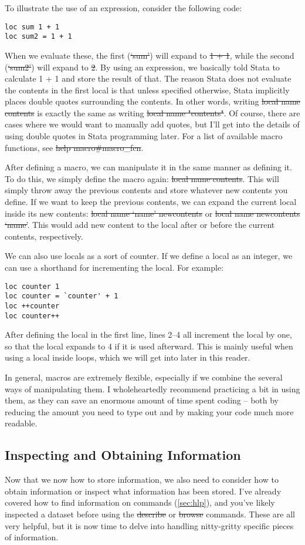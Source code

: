To illustrate the use of an expression, consider the following code:
\begin{verbatim}
loc sum 1 + 1
loc sum2 = 1 + 1
\end{verbatim}
When we evaluate these, the first (\st{`sum'}) will expand to \st{1 + 1},
while the second (\st{`sum2'}) will expand to \st{2}.
By using an expression,
we basically told Stata to calculate 1 + 1 and store the result of that.
The reason Stata does not evaluate the contents in the first local is that unless specified otherwise,
Stata implicitly places double quotes surrounding the contents.
In other words, writing \st{local name contents} is exactly the same as writing \st{local name "contents"}.
Of course, there are cases where we would want to manually add quotes,
but I'll get into the details of using double quotes in Stata programming later.
For a list of available macro functions, see \st{help macro#macro_fcn}.

After defining a macro, we can manipulate it in the same manner as defining it.
To do this, we simply define the macro again: \st{local name contents}.
This will simply throw away the previous contents and store whatever new contents you define.
If we want to keep the previous contents,
we can expand the current local inside its new contents:
\st{local name `name' newcontents} or \st{local name newcontents `name'}.
This would add new content to the local after or before the current contents,
respectively.

We can also use locals as a sort of counter.
If we define a local as an integer,
we can use a shorthand for incrementing the local.
For example:
\begin{verbatim}
loc counter 1
loc counter = `counter' + 1
loc ++counter
loc counter++
\end{verbatim}
After defining the local in the first line,
lines 2--4 all increment the local by one,
so that the local expands to 4 if it is used afterward.
This is mainly useful when using a local inside loops,
which we will get into later in this reader.

In general, macros are extremely flexible,
especially if we combine the several ways of manipulating them.
I wholeheartedly recommend practicing a bit in using them,
as they can save an enormous amount of time spent coding --
both by reducing the amount you need to type out and by making your code much more readable.

\subsection{Inspecting and Obtaining Information}
Now that we now how to store information,
we also need to consider how to obtain information or inspect what information has been stored.
I've already covered how to find information on commands (\cref{sec:hlp}),
and you've likely inspected a dataset before using the \st{describe} or \st{browse} commands.
These are all very helpful, but it is now time to delve into handling nitty-gritty specific pieces of information.

